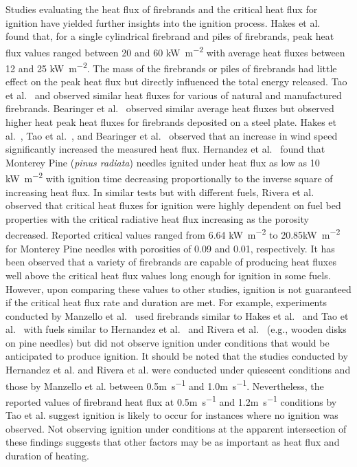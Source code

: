     Studies evaluating the heat flux of firebrands and the critical heat flux for ignition have yielded further insights into the ignition process. Hakes et al.~\cite{Hakes2019a} found that, for a single cylindrical firebrand and piles of firebrands, peak heat flux values ranged between 20 and 60 \si{\kilo\watt\per\square\meter} with average heat fluxes between 12 and 25 \si{\kilo\watt\per\square\meter}. The mass of the firebrands or piles of firebrands had little effect on the peak heat flux but directly influenced the total energy released. Tao et al.~\cite{Tao2020} and  observed similar heat fluxes for various of natural and manufactured firebrands. Bearinger et al.~\cite{Bearinger2021LocalizedSurfaces} observed similar average heat fluxes but observed higher heat peak heat fluxes for firebrands deposited on a steel plate. Hakes et al.~\cite{Hakes2019a}, Tao et al.~\cite{Tao2020}, and Bearinger et al.~\cite{Bearinger2021LocalizedSurfaces} observed that an increase in wind speed significantly increased the measured heat flux. Hernandez et al.~\cite{Hernandez2017} found that Monterey Pine (\textit{pinus radiata}) needles ignited under heat flux as low as 10 \si{\kilo\watt\per\square\meter} with ignition time decreasing proportionally to the inverse square of increasing heat flux. In similar tests but with different fuels, Rivera et al.~\cite{Rivera2020} observed that critical heat fluxes for ignition were highly dependent on fuel bed properties with the critical radiative heat flux increasing as the porosity decreased. Reported critical values ranged from 6.64 \si{\kilo\watt\per\square\meter} to 20.85\si{\kilo\watt\per\square\meter} for Monterey Pine needles with porosities of 0.09 and 0.01, respectively. It has been observed that a variety of firebrands are capable of producing heat fluxes well above the critical heat flux values long enough for ignition in some fuels. However, upon comparing these values to other studies, ignition is not guaranteed if the critical heat flux rate and duration are met. For example, experiments conducted by Manzello et al.~\cite{Manzello2008} used firebrands similar to Hakes et al.~\cite{Hakes2019a} and Tao et al.~\cite{Tao2020} with fuels similar to Hernandez et al.~\cite{Hernandez2017} and Rivera et al.~\cite{Rivera2020} (e.g., wooden disks on pine needles) but did not observe ignition under conditions that would be anticipated to produce ignition. It should be noted that the studies conducted by Hernandez et al. and Rivera et al. were conducted under quiescent conditions and those by Manzello et al. between 0.5\si{\meter\per\second} and 1.0\si{\meter\per\second}. Nevertheless, the reported values of firebrand heat flux at 0.5\si{\meter\per\second} and 1.2\si{\meter\per\second} conditions by Tao et al. suggest ignition is likely to occur for instances where no ignition was observed. Not observing ignition under conditions at the apparent intersection of these findings suggests that other factors may be as important as heat flux and duration of heating. 

